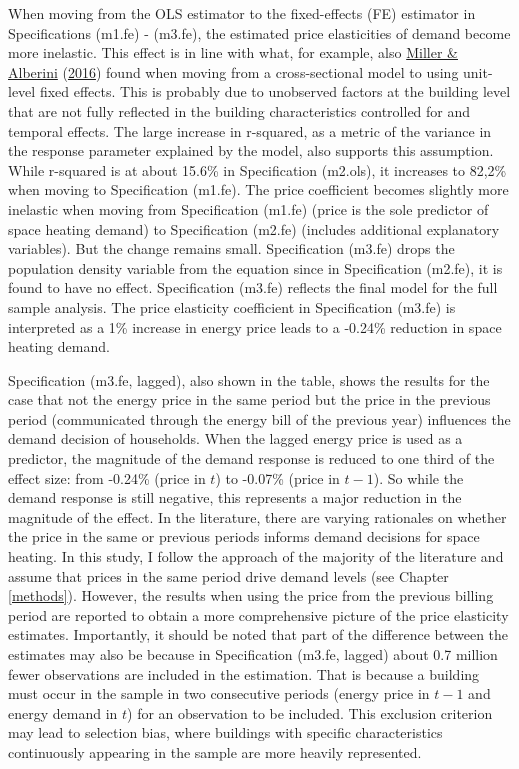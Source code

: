 \documentclass[12pt,twoside]{reedthesis}
\begin{document}
When moving from the OLS estimator to the fixed-effects (FE) estimator in Specifications (m1.fe) - (m3.fe), the estimated price elasticities of demand become more inelastic. This effect is in line with what, for example, also \protect\hyperlink{ref-miller_alberini16}{Miller \& Alberini} (\protect\hyperlink{ref-miller_alberini16}{2016}) found when moving from a cross-sectional model to using unit-level fixed effects. This is probably due to unobserved factors at the building level that are not fully reflected in the building characteristics controlled for and temporal effects. The large increase in r-squared, as a metric of the variance in the response parameter explained by the model, also supports this assumption. While r-squared is at about 15.6\% in Specification (m2.ols), it increases to 82,2\% when moving to Specification (m1.fe). The price coefficient becomes slightly more inelastic when moving from Specification (m1.fe) (price is the sole predictor of space heating demand) to Specification (m2.fe) (includes additional explanatory variables). But the change remains small. Specification (m3.fe) drops the population density variable from the equation since in Specification (m2.fe), it is found to have no effect. Specification (m3.fe) reflects the final model for the full sample analysis. The price elasticity coefficient in Specification (m3.fe) is interpreted as a 1\% increase in energy price leads to a -0.24\% reduction in space heating demand.

Specification (m3.fe, lagged), also shown in the table, shows the results for the case that not the energy price in the same period but the price in the previous period (communicated through the energy bill of the previous year) influences the demand decision of households. When the lagged energy price is used as a predictor, the magnitude of the demand response is reduced to one third of the effect size: from -0.24\% (price in \(t\)) to -0.07\% (price in \(t-1\)). So while the demand response is still negative, this represents a major reduction in the magnitude of the effect. In the literature, there are varying rationales on whether the price in the same or previous periods informs demand decisions for space heating. In this study, I follow the approach of the majority of the literature and assume that prices in the same period drive demand levels (see Chapter \ref{methods}). However, the results when using the price from the previous billing period are reported to obtain a more comprehensive picture of the price elasticity estimates. Importantly, it should be noted that part of the difference between the estimates may also be because in Specification (m3.fe, lagged) about 0.7 million fewer observations are included in the estimation. That is because a building must occur in the sample in two consecutive periods (energy price in \(t-1\) and energy demand in \(t\)) for an observation to be included. This exclusion criterion may lead to selection bias, where buildings with specific characteristics continuously appearing in the sample are more heavily represented.
\end{document}
